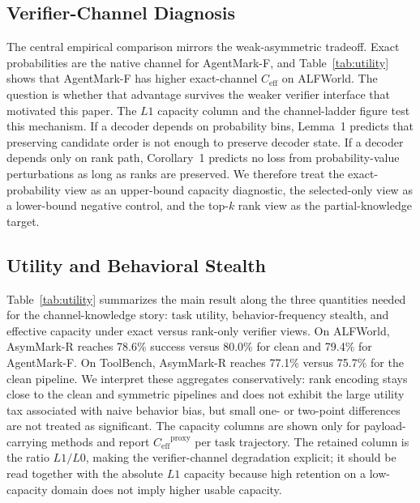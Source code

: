 \documentclass[conference,compsoc]{IEEEtran}
\newcommand{\ours}{AsymMark-R}
\newcommand{\agentmark}{AgentMark-F}
\newcommand{\Ceff}{\ensuremath{C_{\mathrm{eff}}}}
\begin{document}
\subsection{Verifier-Channel Diagnosis}

The central empirical comparison mirrors the weak-asymmetric tradeoff. Exact probabilities are the native channel for \agentmark{}, and Table~\ref{tab:utility} shows that \agentmark{} has higher exact-channel $\Ceff$ on ALFWorld. The question is whether that advantage survives the weaker verifier interface that motivated this paper. The $L1$ capacity column and the channel-ladder figure test this mechanism. If a decoder depends on probability bins, Lemma~1 predicts that preserving candidate order is not enough to preserve decoder state. If a decoder depends only on rank path, Corollary~1 predicts no loss from probability-value perturbations as long as ranks are preserved. We therefore treat the exact-probability view as an upper-bound capacity diagnostic, the selected-only view as a lower-bound negative control, and the top-$k$ rank view as the partial-knowledge target.

\subsection{Utility and Behavioral Stealth}

Table~\ref{tab:utility} summarizes the main result along the three quantities needed for the channel-knowledge story: task utility, behavior-frequency stealth, and effective capacity under exact versus rank-only verifier views. On ALFWorld, \ours{} reaches 78.6\% success versus 80.0\% for clean and 79.4\% for \agentmark{}. On ToolBench, \ours{} reaches 77.1\% versus 75.7\% for the clean pipeline. We interpret these aggregates conservatively: rank encoding stays close to the clean and symmetric pipelines and does not exhibit the large utility tax associated with naive behavior bias, but small one- or two-point differences are not treated as significant. The capacity columns are shown only for payload-carrying methods and report $\Ceff^{\mathrm{proxy}}$ per task trajectory. The retained column is the ratio $L1/L0$, making the verifier-channel degradation explicit; it should be read together with the absolute $L1$ capacity because high retention on a low-capacity domain does not imply higher usable capacity.
\end{document}
